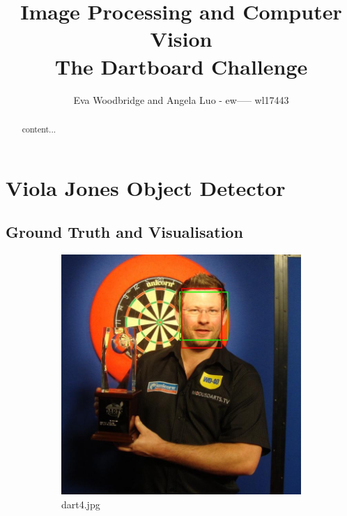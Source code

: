 \documentclass[11pt,a4paper, twocolumn]{article}
\author{Eva Woodbridge and Angela Luo - ew----- wl17443}
\begin{document}
	\title{%
		Image Processing and Computer Vision \\
		\large The Dartboard Challenge}
	\maketitle 
	\begin{abstract}
		content...
	\end{abstract}
	\section{Viola Jones Object Detector}
	\subsection{Ground Truth and Visualisation}
		\begin{figure}[h!]
			\centering
			\begin{subfigure}[b]{0.4\linewidth}
				\includegraphics[width=\linewidth]{dart4_post.jpg}
				\caption{dart4.jpg}
			\end{subfigure}
			\begin{subfigure}[b]{0.4\linewidth}

\end{subfigure}
\end{figure}
\end{document}
